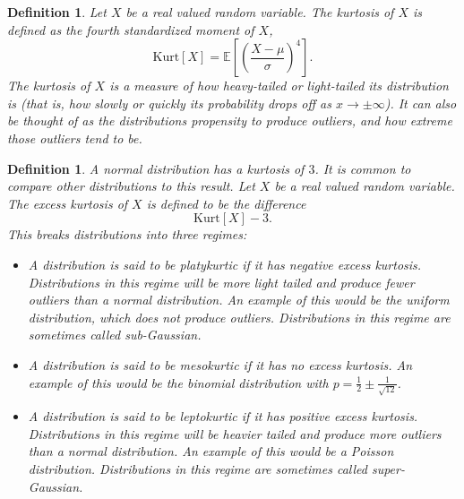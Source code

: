 \documentclass[1pt]{report}
\newtheorem{defn}[thm]{Definition}
\newcommand{\<}{\langle}
\renewcommand{\>}{\rangle}
\newcommand{\E}{\mathbb{E}}
\begin{document}
\begin{defn}\label{def:kurtosis}
Let $X$ be a real valued random variable. The \emph{kurtosis} of $X$ is defined as the fourth standardized moment of $X$,
$$\text{Kurt}[X] = \E\left[\left(\frac{X-\mu}{\sigma}\right)^4\right].$$
The kurtosis of $X$ is a measure of how heavy-tailed or light-tailed its distribution is (that is, how slowly or quickly its probability drops off as $x \to \pm \infty$). It can also be thought of as the distributions propensity to produce outliers, and how extreme those outliers tend to be.
\end{defn}
\begin{defn}\label{def:excesskurtosis}
A normal distribution has a kurtosis of $3$. It is common to compare other distributions to this result. Let $X$ be a real valued random variable. The \emph{excess kurtosis} of $X$ is defined to be the difference
$$\text{Kurt}[X] - 3.$$
This breaks distributions into three regimes:
\begin{itemize}
\item A distribution is said to be \emph{platykurtic} if it has negative excess kurtosis. Distributions in this regime will be more light tailed and produce fewer outliers than a normal distribution. An example of this would be the uniform distribution, which does not produce outliers. Distributions in this regime are sometimes called \emph{sub-Gaussian}.
\item A distribution is said to be \emph{mesokurtic} if it has no excess kurtosis. An example of this would be the binomial distribution with $p = \frac{1}{2} \pm \frac{1}{\sqrt{12}}$.
\item A distribution is said to be \emph{leptokurtic} if it has positive excess kurtosis. Distributions in this regime will be heavier tailed and produce more outliers than a normal distribution. An example of this would be a Poisson distribution. Distributions in this regime are sometimes called \emph{super-Gaussian}.
\end{itemize}
\end{defn}
\end{document}
